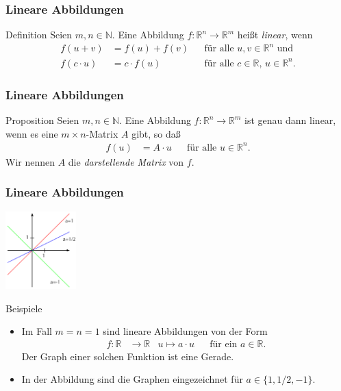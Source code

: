 \documentclass{beamer}
\title[Linadi]{\mytitle}
\author[Amin Coja-Oghlan]{Amin Coja-Oghlan}
\institute[Frankfurt]{JWGUFFM}
\date{}
\renewcommand{\emph}[1]{{\textcolor{solarizedRed}{\itshape #1}}}
\newcommand\NN{\mathbb N}
\newcommand\RR{\mathbb R}
\newcommand{\ue}{\"u}
\newcommand{\mytitle}{Lineare Abbildungen}
\begin{document}
\frame[plain]{\titlepage}

\begin{frame}\frametitle{\mytitle}
	\begin{block}{Definition}
		Seien $m,n\in\NN$.
		Eine Abbildung $f:\RR^n\to\RR^m$ hei\ss t \emph{linear}, wenn
		\begin{align*}
			f(u+v)&=f(u)+f(v)&&\mbox{f\ue r alle }u,v\in\RR^n\mbox{ und}\\
			f(c\cdot u)&=c\cdot f(u)&&\mbox{f\ue r alle }c\in\RR,\,u\in\RR^n.
		\end{align*}
	\end{block}
\end{frame}

\begin{frame}\frametitle{\mytitle}
	\begin{block}{Proposition}
		Seien $m,n\in\NN$.
		Eine Abbildung $f:\RR^n\to\RR^m$ ist genau dann linear, wenn es eine $m\times n$-Matrix $A$ gibt, so da\ss\
		\begin{align*}
			f(u)&=A\cdot u&&\mbox{f\ue r alle }u\in\RR^n.
		\end{align*}
		Wir nennen $A$ die \emph{darstellende Matrix} von $f$.
	\end{block}
\end{frame}

\begin{frame}\frametitle{\mytitle}
	\hfill\includegraphics[height=30mm]{pics/linear1d.pdf}
	\begin{block}{Beispiele}
	\begin{itemize}
	\item Im Fall $m=n=1$ sind lineare Abbildungen von der Form
		\begin{align*}
			f:\RR&\to\RR&u\mapsto a\cdot u&&\mbox{f\ue r ein }a\in\RR.
		\end{align*}
		Der Graph einer solchen Funktion ist eine Gerade.
	\item In der Abbildung sind die Graphen eingezeichnet f\ue r $a\in\{1,1/2,-1\}$.
	\end{itemize}
	\end{block}
\end{frame}
\end{document}
